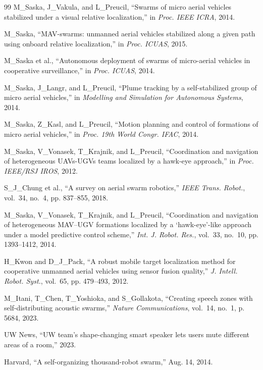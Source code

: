 \documentclass[letterpaper, 10pt, conference]{IEEEtran}
\begin{document}
\begin{thebibliography}{99}
M\_Saska, J\_Vakula, and L\_Preucil, ``Swarms of micro aerial vehicles stabilized under a visual relative localization,'' in \emph{Proc. IEEE ICRA}, 2014.

M\_Saska, ``{MAV}-swarms: unmanned aerial vehicles stabilized along a given path using onboard relative localization,'' in \emph{Proc. ICUAS}, 2015.

M\_Saska et al., ``Autonomous deployment of swarms of micro-aerial vehicles in cooperative surveillance,'' in \emph{Proc. ICUAS}, 2014.

M\_Saska, J\_Langr, and L\_Preucil, ``Plume tracking by a self-stabilized group of micro aerial vehicles,'' in \emph{Modelling and Simulation for Autonomous Systems}, 2014.

M\_Saska, Z\_Kasl, and L\_Preucil, ``Motion planning and control of formations of micro aerial vehicles,'' in \emph{Proc. 19th World Congr. IFAC}, 2014.

M\_Saska, V\_Vonasek, T\_Krajnik, and L\_Preucil, ``Coordination and navigation of heterogeneous {UAV}s-{UGV}s teams localized by a hawk-eye approach,'' in \emph{Proc. IEEE/RSJ IROS}, 2012.

S\_J\_Chung et al., ``A survey on aerial swarm robotics,'' \emph{IEEE Trans. Robot.}, vol.~34, no.~4, pp. 837--855, 2018.

M\_Saska, V\_Vonasek, T\_Krajnik, and L\_Preucil, ``Coordination and navigation of heterogeneous {MAV}–{UGV} formations localized by a ‘hawk-eye’-like approach under a model predictive control scheme,'' \emph{Int. J. Robot. Res.}, vol.~33, no.~10, pp. 1393--1412, 2014.

H\_Kwon and D\_J\_Pack, ``A robust mobile target localization method for cooperative unmanned aerial vehicles using sensor fusion quality,'' \emph{J. Intell. Robot. Syst.}, vol.~65, pp. 479--493, 2012.

M\_Itani, T\_Chen, T\_Yoshioka, and S\_Gollakota, ``Creating speech zones with self-distributing acoustic swarms,'' \emph{Nature Communications}, vol.~14, no.~1, p. 5684, 2023.

UW News, ``{UW} team's shape-changing smart speaker lets users mute different areas of a room,'' 2023.

Harvard, ``A self-organizing thousand-robot swarm,'' Aug. 14, 2014.


\end{thebibliography}
\end{document}
